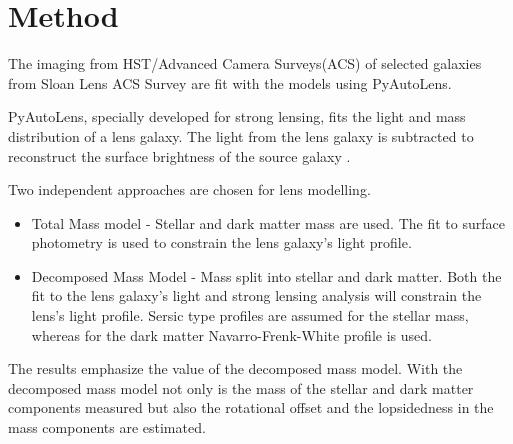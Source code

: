 \documentclass{article}
\begin{document}
\section{Method}

The imaging from HST/Advanced Camera Surveys(ACS) of selected galaxies from Sloan Lens ACS Survey\cite{bolton2008sloan} are fit with the models using PyAutoLens\cite{Nightingale_2021}. 

PyAutoLens, specially developed for strong lensing, fits the light and mass distribution of a lens galaxy. The light from the lens galaxy is subtracted to reconstruct the surface brightness of the source galaxy \cite{Nightingale_2021}. 

Two independent approaches are chosen for lens modelling\cite{Nightingale_2019}.

\begin{itemize}
    \item Total Mass model - Stellar and dark matter mass are used. The fit to surface photometry is used to constrain the lens galaxy's light profile\cite{Nightingale_2019}.
    \item Decomposed Mass Model - Mass split into stellar and dark matter. Both the fit to the lens galaxy's light and strong lensing analysis will constrain the lens's light profile. Sersic type profiles are assumed for the stellar mass, whereas for the dark matter Navarro-Frenk-White profile is used\cite{Nightingale_2019}.
\end{itemize}

The results emphasize the value of the decomposed mass model. With the decomposed mass model not only is the mass of the stellar and dark matter components measured but also the rotational offset and the lopsidedness in the mass components are estimated.

\newpage

\printbibliography
\end{document}
